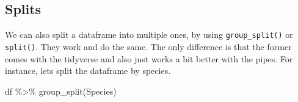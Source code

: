 \documentclass[
]{book}
\newenvironment{Shaded}{\begin{snugshade}}{\end{snugshade}}
\newcommand{\FunctionTok}[1]{\textcolor[rgb]{0.00,0.00,0.00}{#1}}
\newcommand{\NormalTok}[1]{#1}
\newcommand{\SpecialCharTok}[1]{\textcolor[rgb]{0.00,0.00,0.00}{#1}}
\begin{document}
\hypertarget{splits}{%
\subsection{Splits}\label{splits}}

We can also split a dataframe into multiple ones, by using \texttt{group\_split()} or \texttt{split()}.
They work and do the same.
The only difference is that the former comes with the tidyverse and also just works a bit better with the pipes.
For instance, lets split the dataframe by species.

\begin{Shaded}
\begin{Highlighting}[]
\NormalTok{df }\SpecialCharTok{\%\textgreater{}\%} 
  \FunctionTok{group\_split}\NormalTok{(Species)}
\end{Highlighting}
\end{Shaded}
\end{document}

